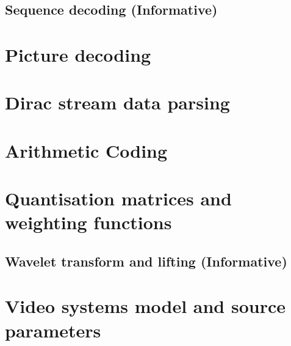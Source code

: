 \clearpage
\begin{informative*}
\section{Sequence decoding (Informative)}
\end{informative*}
\clearpage
\section{Picture decoding}






\appendix
\section{Dirac stream data parsing}

\clearpage
\section{Arithmetic Coding}

\clearpage
\section{Quantisation matrices and weighting functions}


\clearpage
\begin{informative*}
\section{Wavelet transform and lifting (Informative)}

\end{informative*}
\clearpage
\section{Video systems model and source parameters}


